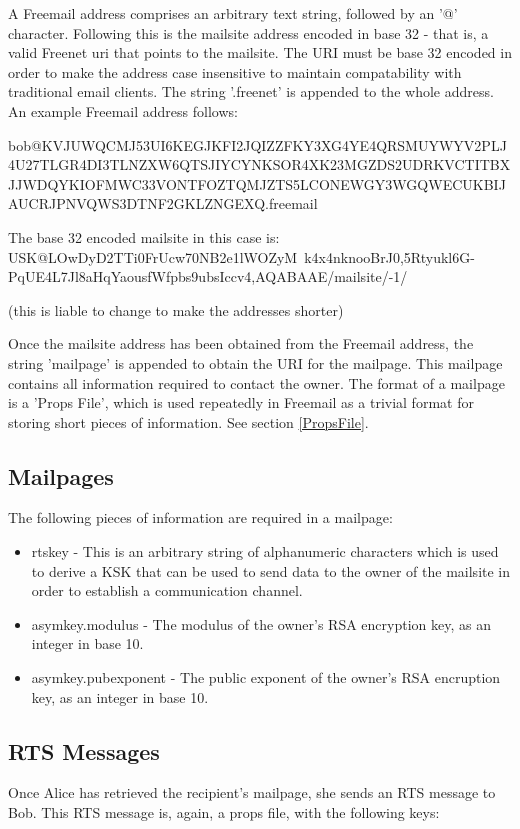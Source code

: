 \documentclass[12pt,a4paper]{article}
\begin{document}
A Freemail address comprises an arbitrary text string, followed by an '@' character. Following this is the mailsite address encoded in base 32 - that is, a valid Freenet uri that points to the mailsite. The URI must be base 32 encoded in order to make the address case insensitive to maintain compatability with traditional email clients. The string '.freenet' is appended to the whole address. An example Freemail address follows:

bob@KVJUWQCMJ53UI6KEGJKFI2JQIZZFKY3XG4YE4QRSMUYWYV2PLJ4U27TLGR4DI3TLNZXW6QTSJIYCYNKSOR4XK23MGZDS2UDRKVCTITBXJJWDQYKIOFMWC33VONTFOZTQMJZTS5LCONEWGY3WGQWECUKBIJAUCRJPNVQWS3DTNF2GKLZNGEXQ.freemail

The base 32 encoded mailsite in this case is: USK@LOwDyD2TTi0FrUcw70NB2e1lWOZyM~k4x4nknooBrJ0,5Rtyukl6G-PqUE4L7Jl8aHqYaousfWfpbs9ubsIccv4,AQABAAE/mailsite/-1/

(this is liable to change to make the addresses shorter)

Once the mailsite address has been obtained from the Freemail address, the string 'mailpage' is appended to obtain the URI for the mailpage. This mailpage contains all information required to contact the owner. The format of a mailpage is a 'Props File', which is used repeatedly in Freemail as a trivial format for storing short pieces of information. See section \ref{PropsFile}.

\subsection{Mailpages}
The following pieces of information are required in a mailpage:

\begin{itemize}
\item rtskey - This is an arbitrary string of alphanumeric characters which is used to derive a KSK that can be used to send data to the owner of the mailsite in order to establish a communication channel.
\item asymkey.modulus - The modulus of the owner's RSA encryption key, as an integer in base 10.
\item asymkey.pubexponent - The public exponent of the owner's RSA encruption key, as an integer in base 10.
\end{itemize}

\subsection{RTS Messages}
Once Alice has retrieved the recipient's mailpage, she sends an RTS message to Bob. This RTS message is, again, a props file, with the following keys:
\end{document}
